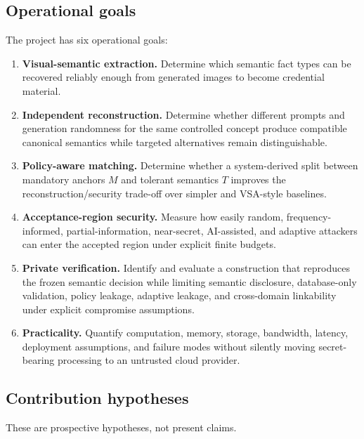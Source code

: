\documentclass[11pt,a4paper]{article}
\begin{document}
\subsection{Operational goals}

The project has six operational goals:

\begin{enumerate}
  \item \textbf{Visual-semantic extraction.} Determine which semantic fact types can be recovered reliably enough from generated images to become credential material.
  \item \textbf{Independent reconstruction.} Determine whether different prompts and generation randomness for the same controlled concept produce compatible canonical semantics while targeted alternatives remain distinguishable.
  \item \textbf{Policy-aware matching.} Determine whether a system-derived split between mandatory anchors $M$ and tolerant semantics $T$ improves the reconstruction/security trade-off over simpler and VSA-style baselines.
  \item \textbf{Acceptance-region security.} Measure how easily random, frequency-informed, partial-information, near-secret, AI-assisted, and adaptive attackers can enter the accepted region under explicit finite budgets.
  \item \textbf{Private verification.} Identify and evaluate a construction that reproduces the frozen semantic decision while limiting semantic disclosure, database-only validation, policy leakage, adaptive leakage, and cross-domain linkability under explicit compromise assumptions.
  \item \textbf{Practicality.} Quantify computation, memory, storage, bandwidth, latency, deployment assumptions, and failure modes without silently moving secret-bearing processing to an untrusted cloud provider.
\end{enumerate}

\subsection{Contribution hypotheses}

These are prospective hypotheses, not present claims.
\end{document}
